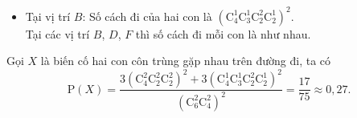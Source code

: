 \begin{ex}
{\begin{itemize}
Hành trình của kiến cũng tương tự mà theo chiều ngược lại nên kiến có $\mathrm{C}_4^2\mathrm{C}_2^2\mathrm{C}_2^2$ cách đi.\\ 
Số cách đi hai con là $\left(\mathrm{C}_4^2\mathrm{C}_2^2\mathrm{C}_2^2\right)^2$.\\
Tại các vị trí $A$, $C$, $E$ thì số cách đi mỗi con là như nhau.
\item Tại vị trí $B$: Số cách đi của hai con là $\left(\mathrm{C}_4^1\mathrm{C}_3^1\mathrm{C}_2^2\mathrm{C}_2^1\right)^2$.\\
Tại các vị trí $B$, $D$, $F$ thì số cách đi mỗi con là như nhau.
	\end{itemize}
Gọi $X$ là biến cố hai con côn trùng gặp nhau trên đường đi, ta có
$$\mathrm{P}(X)=\dfrac{3\left(\mathrm{C}_4^2\mathrm{C}_2^2 \mathrm{C}_2^2\right)^2+3\left(\mathrm{C}_4^1\mathrm{C}_3^1\mathrm{C}_2^2\mathrm{C}_2^1\right)^2}{\left(\mathrm{C}_6^2\mathrm{C}_4^2\right)^2}=\dfrac{17}{75} \approx 0{,}27.$$
}
\end{ex}

